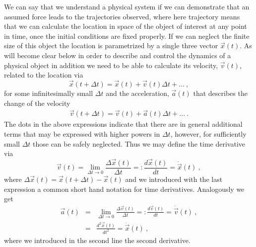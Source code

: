 \documentclass[12pt]{iopart}
\begin{document}
We can say that we understand a physical system if we can demonstrate that an assumed force leads to the trajectories
observed, where here trajectory means that we can calculate the location in space of the object of interest at any point
in time, once the initial conditions are fixed properly. If we can neglect the finite size of this object the location is parametrized
by a single three vector $\vec x(t)$. As will become clear below in order to describe and control the dynamics of a physical
object in addition we need to be able to calculate its velocity, $\vec v(t)$, related to the location via
\begin{equation}
\vec x(t+\Delta t) = \vec x(t) + \vec v(t) \Delta t + ... \ , \label{eq:vdef}
\end{equation}
for some infinitesimally small $\Delta t$ and the acceleration, $\vec a(t)$ that describes the change of the velocity
\begin{eqnarray}
\vec v(t+\Delta t) = \vec v(t) + \vec a(t) \Delta t + ...\ . \label{eq:adef}
\end{eqnarray}
The dots in the above expressions indicate that there are in general additional terms that may be expressed with
higher powers in $\Delta t$, however, for sufficiently small $\Delta t$ those can be safely neglected.
Thus we may define the time derivative via
\begin{equation}
\vec v(t) = \lim_{\Delta t\to 0} \frac{\Delta \vec x(t)}{\Delta t} =: \frac{d\vec x(t)}{dt}  = \dot{\vec  x}(t) \ ,
\end{equation}
where $\Delta \vec x(t)=\vec x(t+\Delta t)-\vec x(t)$ and we introduced with the last expression a common short hand notation
for time derivatives. Analogously we get
\begin{eqnarray}
\vec a(t) &=& \lim_{\Delta t\to 0} \frac{\Delta \vec v(t)}{\Delta t} =: \frac{d\vec v(t)}{dt}  = \dot{\vec v}(t) \ , \\
 &=& \frac{d^2\vec x(t)}{dt^2}  = \ddot{\vec x}(t) \ ,
\end{eqnarray}
where we introduced in the second line the second derivative.
\end{document}
